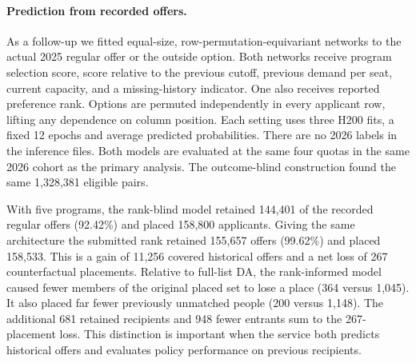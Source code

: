 \paragraph{Prediction from recorded offers.}
As a follow-up we fitted equal-size, row-permutation-equivariant networks to the actual 2025 regular offer or the outside option. Both networks receive program selection score, score relative to the previous cutoff, previous demand per seat, current capacity, and a missing-history indicator. One also receives reported preference rank. Options are permuted independently in every applicant row, lifting any dependence on column position. Each setting uses three H200 fits, a fixed 12 epochs and average predicted probabilities. There are no 2026 labels in the inference files. Both models are evaluated at the same four quotas in the same 2026 cohort as the primary analysis. The outcome-blind construction found the same 1,328,381 eligible pairs.

With five programs, the rank-blind model retained 144,401 of the recorded regular offers (92.42\%) and placed 158,800 applicants. Giving the same architecture the submitted rank retained 155,657 offers (99.62\%) and placed 158,533. This is a gain of 11,256 covered historical offers and a net loss of 267 counterfactual placements. Relative to full-list DA, the rank-informed model caused fewer members of the original placed set to lose a place (364 versus 1,045). It also placed far fewer previously unmatched people (200 versus 1,148). The additional 681 retained recipients and 948 fewer entrants sum to the 267-placement loss. This distinction is important when the service both predicts historical offers and evaluates policy performance on previous recipients.
